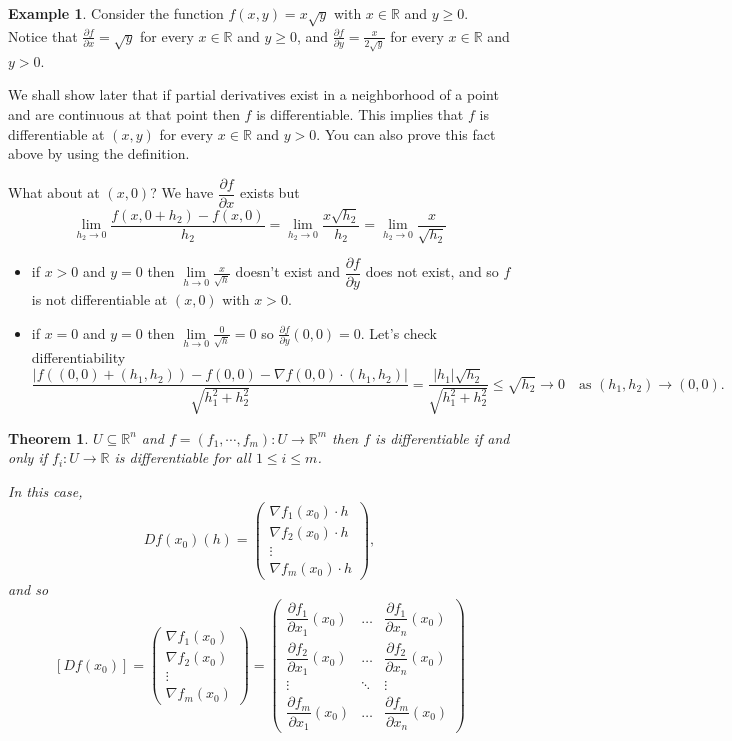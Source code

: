 \documentclass[11pt,openany]{book}
\theoremstyle{plain}
\newtheorem{theorem}{Theorem}[chapter]
\theoremstyle{definition}
\newtheorem{example}{Example}[chapter]
\theoremstyle{remark}
\newcommand{\R}{\mathbb{R}}
\newcommand{\dell}[2]{\dfrac{\partial #1}{\partial #2}}
\begin{document}
\begin{example}
 Consider the function $f(x,y) = x \sqrt{y}$ with $x\in \mathbb R$ and $y\geq 0$.
 Notice that $\frac{\partial f}{\partial x} = \sqrt{y}$ for every $x\in \mathbb R$ and $y\geq 0$, and  $\frac{\partial f}{\partial y} = \frac{x}{2\sqrt{y}}$ for every $x\in \mathbb R$ and $y>0$.

 We shall show later that if partial derivatives exist in a neighborhood of a point and are continuous at that point then $f$ is differentiable. This implies that $f$ is differentiable at $(x,y)$ for every $x\in \mathbb R$ and $y>0$. You can also prove this fact above by using the definition.
 
What about at $(x,0)$? We have $\dfrac{\partial f}{\partial x}$ exists but 
    \[\lim_{h_2 \to 0} \frac{f(x,0+h_2)-f(x,0)}{h_2} = \lim_{h_2 \to 0} \frac{x \sqrt{h_2}}{h_2} = \lim\limits_{h_2 \to 0} \frac{x}{\sqrt{h_2}}\]
    \begin{itemize}
        \item if $x > 0$ and $y =0 $ then $\lim\limits_{h \to 0} \frac{x}{\sqrt{h}}$ doesn't exist and $\dfrac{\partial f}{\partial y}$ does not exist, and so $f$ is not differentiable at $(x,0)$ with $x>0$.
        \item if $x = 0$ and $y = 0$ then $\lim\limits_{h \to 0} \frac{0}{\sqrt{h}} = 0$ so $\frac{\partial f}{\partial y}(0,0) = 0$. Let's check differentiability
        $$\dfrac{|f((0,0)+(h_1,h_2))-f(0,0)-\nabla f(0,0)\cdot (h_1,h_2)|}{\sqrt{h_1^2+h_2^2}}=\dfrac{|h_1|\sqrt{h_2}}{\sqrt{h_1^2+h_2^2}}\leq \sqrt{h_2}\to 0\quad \text{as $(h_1,h_2)\to (0,0)$}.$$
    \end{itemize}
\end{example}

\begin{theorem}
    $U \subseteq \R^n$ and $f=(f_1,\cdots,f_m): U \to \R^m$ then $f$ is differentiable if and only if $f_i: U \to \R$ is differentiable for all $1 \le i \le m$.
    
    In this case, \[Df(x_0)(h)= \begin{pmatrix}
        \nabla f_1(x_0)\cdot h \\
        \nabla f_2(x_0)\cdot h \\
        \vdots \\
        \nabla f_m(x_0)\cdot h
    \end{pmatrix},\] and so 
    \[[Df(x_0)] = \begin{pmatrix}
    \nabla f_1(x_0)\\
    \nabla f_2(x_0)\\
    \vdots\\
    \nabla f_m(x_0)\end{pmatrix} = \begin{pmatrix}
    \dell{f_1}{x_1}(x_0) & \dots & \dell{f_1}{x_n}(x_0)\\
    \dell{f_2}{x_1}(x_0) & \dots & \dell{f_2}{x_n}(x_0)\\
    \vdots & \ddots & \vdots\\
    \dell{f_m}{x_1}(x_0) & \dots & \dell{f_m}{x_n}(x_0)
    \end{pmatrix} \]
\end{theorem}
\end{document}
